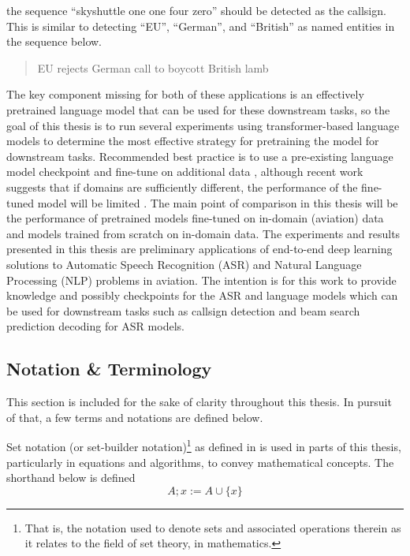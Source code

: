 \documentclass[12pt]{article}
\begin{document}
\noindent
the sequence ``skyshuttle one one four zero'' should be detected as the callsign. This is similar to detecting ``EU'', ``German'', and ``British'' as
named entities in the sequence below.

\begin{quote}
    EU rejects German call to boycott British lamb
\end{quote}

The key component missing for both of these applications is an effectively pretrained language model that can be used for these downstream tasks, so
the goal of this thesis is to run several experiments using transformer-based language models to determine the most effective strategy for pretraining
the model for downstream tasks. Recommended best practice is to use a pre-existing language model checkpoint and fine-tune on additional data
\cite{devlin_bert_2019,liu_roberta_2019,lewis_bart_2019}, although recent work suggests that if domains are sufficiently different, the performance
of the fine-tuned model will be limited \cite{yadlowsky_pretraining_2023}. The main point of comparison in this thesis will be the performance of
pretrained models fine-tuned on in-domain (aviation) data and models trained from scratch on in-domain data. The experiments and results presented in
this thesis are preliminary applications of end-to-end deep learning solutions to Automatic Speech Recognition (ASR) and Natural Language Processing
(NLP) problems in aviation. The intention is for this work to provide knowledge and possibly checkpoints for the ASR and language models which can be
used for downstream tasks such as callsign detection and beam search prediction decoding for ASR models.

\subsection{Notation \& Terminology}
This section is included for the sake of clarity throughout this thesis. In pursuit of that, a few terms and notations are defined below.

Set notation (or set-builder notation)\footnote{That is, the notation used to denote sets and associated operations therein as it relates to the field
    of set theory, in mathematics.} as defined in \cite{jech_chapter_1978} is used in parts of this thesis, particularly in equations and algorithms,
to convey mathematical concepts. The shorthand below is defined
\begin{equation*}
    A; x := A \cup \{x\}
\end{equation*}
\end{document}
